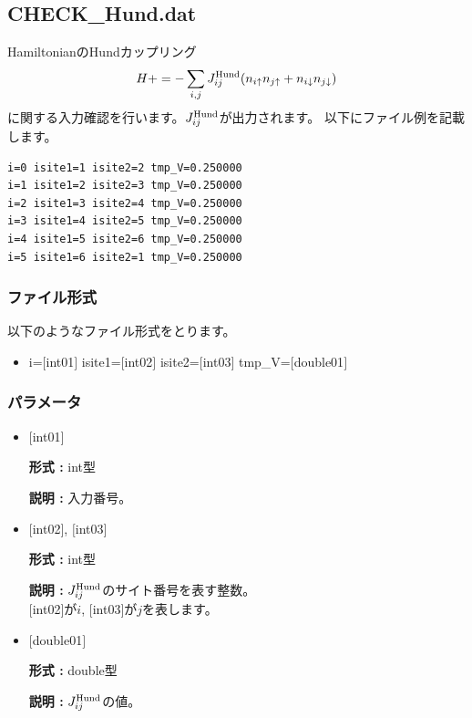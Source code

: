 \newpage
\subsection{CHECK\_Hund.dat}
HamiltonianのHundカップリング
\begin{align}
H += -\sum_{i,j}J_{ij}^{\rm Hund} (n_{i\uparrow}n_{j\uparrow}+n_{i\downarrow}n_{j\downarrow})
\end{align}
に関する入力確認を行います。$J_{ij}^{\rm Hund}$が出力されます。
以下にファイル例を記載します。

\begin{minipage}{12.5cm}
\begin{screen}
\begin{verbatim}
i=0 isite1=1 isite2=2 tmp_V=0.250000 
i=1 isite1=2 isite2=3 tmp_V=0.250000 
i=2 isite1=3 isite2=4 tmp_V=0.250000 
i=3 isite1=4 isite2=5 tmp_V=0.250000 
i=4 isite1=5 isite2=6 tmp_V=0.250000 
i=5 isite1=6 isite2=1 tmp_V=0.250000 
\end{verbatim}
\end{screen}
\end{minipage}

\subsubsection{ファイル形式}
以下のようなファイル形式をとります。
 \begin{itemize}
   \item  i=$[$int01$]$ isite1=$[$int02$]$ isite2=$[$int03$]$ tmp\_V=$[$double01$]$ 
 \end{itemize}
 
\subsubsection{パラメータ}
 \begin{itemize}

    \item  $[$int01$]$ 
   
    {\bf 形式 :} int型

   {\bf 説明 :} 入力番号。
      
   \item  $[$int02$]$, $[$int03$]$
   
    {\bf 形式 :} int型

    {\bf 説明 :}  $J_{ij}^{\rm Hund}$のサイト番号を表す整数。 \\
    $[$int02$]$が$i$, $[$int03$]$が$j$を表します。
 
   \item  $[$double01$]$ 
   
    {\bf 形式 :} double型

   {\bf 説明 :} $J_{ij}^{\rm Hund}$の値。
\end{itemize}

